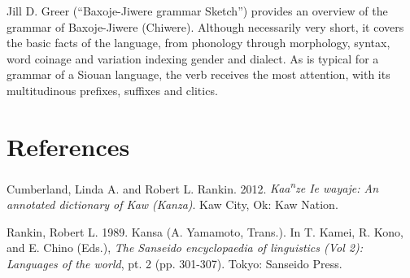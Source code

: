 \begin{refsection}
Jill D. Greer (``Baxoje-Jiwere grammar Sketch'') provides an overview of the grammar of Baxoje-Jiwere (Chiwere). Although necessarily very short, it covers the basic facts of the language, from phonology through morphology, syntax, word coinage and variation indexing gender and dialect. As is typical for a grammar of a Siouan language, the verb receives the most attention, with its multitudinous prefixes, suffixes and clitics. 

\section*{References}


\printbibliography[heading=subbibliography,notkeyword=this]

\begin{reflist}

Cumberland, Linda A. and Robert L. Rankin. 2012. \textit{Kaa\textsuperscript{n}ze Ie wayaje: An annotated dictionary of Kaw (Kanza)}. Kaw City, Ok: Kaw Nation.

Rankin, Robert L. 1989. Kansa (A. Yamamoto, Trans.). In T. Kamei, R. Kono, and E. Chino (Eds.), \textit{The Sanseido encyclopaedia of linguistics (Vol 2): Languages of the world}, pt. 2 (pp. 301-307). Tokyo: Sanseido Press.

\end{reflist}
\end{refsection}

